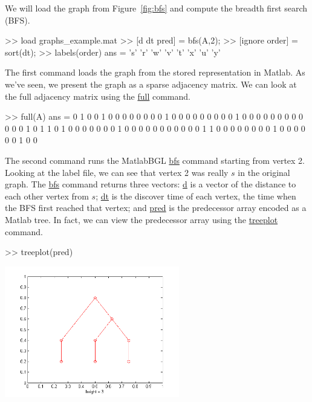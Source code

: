 \documentclass[12pt]{article}
\newcommand{\mycmd}[1]{\url{#1}}
\begin{document}
We will load the graph from Figure~\ref{fig:bfs} and compute the breadth first search (BFS).

\begin{mcode}
>> load graphs\bfs_example.mat
>> [d dt pred] = bfs(A,2);
>> [ignore order] = sort(dt);
>> labels(order)
ans = 
    's'
    'r'
    'w'
    'v'
    't'
    'x'
    'u'
    'y'
\end{mcode}

The first command loads the graph from the stored representation in Matlab.  As we've seen, we present the graph as a sparse adjacency matrix.  We can look at the full adjacency matrix using the \mycmd{full} command.

\begin{mcode}
>> full(A)
ans =
     0     1     0     0     1     0     0     0     0
     0     0     0     0     1     0     0     0     0
     0     0     0     0     0     1     0     0     0
     0     0     0     0     0     0     0     0     0
     1     0     1     1     0     1     0     0     0
     0     0     0     0     1     0     0     0     0
     0     0     0     0     0     0     0     1     1
     0     0     0     0     0     0     0     0     1
     0     0     0     0     0     0     1     0     0
\end{mcode}

The second command runs the MatlabBGL \mycmd{bfs} command starting from vertex 2.  Looking at the label file, we can see that vertex 2 was really $s$ in the original graph.  The \mycmd{bfs} command returns three vectors: \mycmd{d} is a vector of the distance to each other vertex from $s$; \mycmd{dt} is the discover time of each vertex, the time when the BFS first reached that vertex; and \mycmd{pred} is the predecessor array encoded as a Matlab tree.  In fact, we can view the predecessor array using the \mycmd{treeplot} command.

\begin{mcode}
>> treeplot(pred)
\end{mcode}
\begin{center}
\includegraphics[width=3in]{bfs_treeplot}
\end{center}
\end{document}
